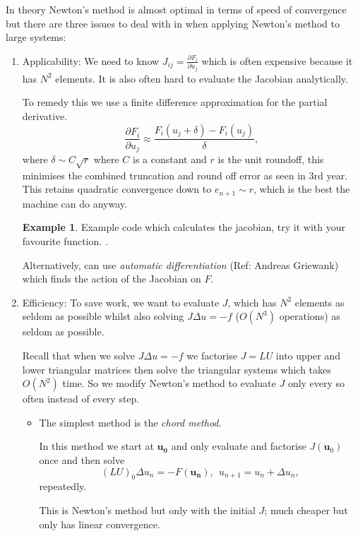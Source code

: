 \documentclass[12pt, a4paper]{article}
\renewcommand{\vec}[1]{\mathbf{#1}}
\theoremstyle{definition}
\newtheorem{example}[thm]{Example}
\theoremstyle{remark}
\numberwithin{equation}{section}
\begin{document}
In theory Newton's method is almost optimal in terms of speed of convergence but there 
 are three issues to deal with in when applying Newton's method to large systems:
\begin{enumerate}
\item Applicability: We need to know $J_{ij}=\frac{\partial F_i}{\partial u_j}$ which is often expensive because it has $N^2$ elements. It is also often hard to evaluate the Jacobian analytically.

To remedy this we use a finite difference approximation for the partial derivative.
\begin{equation*}
\frac{\partial F_i}{\partial u_j} \approx \frac{F_i(u_j + \delta) - F_i(u_j)}{\delta},
\end{equation*}
where $\delta \sim C\sqrt{r}$ where $C$ is a constant and $r$ is the unit roundoff, this minimises the combined truncation and round off error as seen in 3rd year.
This retains quadratic convergence down to $e_{n+1} \sim r$, which is the best the machine can do anyway.

 \begin{example}
 Example code which calculates the jacobian, try it with your favourite function. .
 \end{example}

Alternatively, can use \emph{automatic differentiation} (Ref:  Andreas Griewank) which  finds the action of the Jacobian on $F$.

\item Efficiency: To save work, we want to evaluate $J$, which has $N^2$ elements as seldom as possible whilst also solving $J \Delta u = -f$ ($O(N^3)$ operations) as seldom as possible.

Recall that when we solve $J \Delta u = -f$ we factorise $J=LU$ into upper and lower triangular matrices then solve the triangular systems which takes $O(N^2)$ time.
So we modify Newton's method to evaluate $J$ only every so often instead of every step.

\begin{itemize}
\item The simplest method is the \emph{chord method}.

In this method we start at $\vec{u_0}$ and only evaluate and factorise $J(\vec{u}_0)$ once and then solve 
\[(LU)_0 \Delta u_{n} = -F(\vec{u_n}), \ \ u_{n+1}=u_n+\Delta u_n,\]
 repeatedly.

This is Newton's method but only with the initial $J$; much cheaper but only has linear convergence.


\end{itemize}
\end{enumerate}
\end{document}
